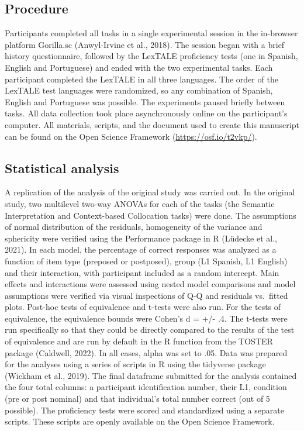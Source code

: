 \documentclass[
  man,floatsintext]{apa6}
\begin{document}
\hypertarget{procedure}{%
\subsection{Procedure}\label{procedure}}

Participants completed all tasks in a single experimental session in the in-browser platform Gorilla.sc (Anwyl-Irvine et al., 2018).
The session began with a brief history questionnaire, followed by the LexTALE proficiency tests (one in Spanish, English and Portuguese) and ended with the two experimental tasks.
Each participant completed the LexTALE in all three languages.
The order of the LexTALE test languages were randomized, so any combination of Spanish, English and Portuguese was possible.
The experiments paused briefly between tasks.
All data collection took place asynchronously online on the participant's computer.
All materials, scripts, and the document used to create this manuscript can be found on the Open Science Framework (\url{https://osf.io/t2vkp/}).

\hypertarget{statistical-analysis}{%
\subsection{Statistical analysis}\label{statistical-analysis}}

A replication of the analysis of the original study was carried out.
In the original study, two multilevel two-way ANOVAs for each of the tasks (the Semantic Interpretation and Context-based Collocation tasks) were done.
The assumptions of normal distribution of the residuals, homogeneity of the variance and sphericity were verified using the Performance package in R (Lüdecke et al., 2021).
In each model, the percentage of correct responses was analyzed as a function of item type (preposed or postposed), group (L1 Spanish, L1 English) and their interaction, with participant included as a random intercept.
Main effects and interactions were assessed using nested model comparisons and model assumptions were verified via visual inspections of Q-Q and residuals vs.~fitted plots.
Post-hoc tests of equivalence and t-tests were also run.
For the tests of equivalence, the equivalence bounds were Cohen's d = +/- .4.
The t-tests were run specifically so that they could be directly compared to the results of the test of equivalence and are run by default in the R function from the TOSTER package (Caldwell, 2022).
In all cases, alpha was set to .05.
Data was prepared for the analyses using a series of scripts in R using the tidyverse package (Wickham et al., 2019).
The final dataframe submitted for the analysis contained the four total columns: a participant identification number, their L1, condition (pre or post nominal) and that individual's total number correct (out of 5 possible).
The proficiency tests were scored and standardized using a separate scripts.
These scripts are openly available on the Open Science Framework.
\end{document}
